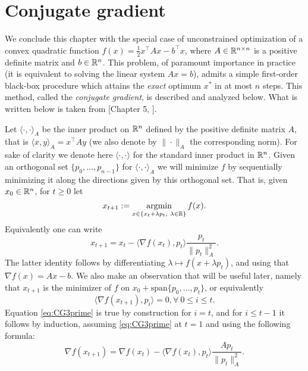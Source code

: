 \section{Conjugate gradient} \label{sec:CG}
We conclude this chapter with the special case of unconstrained optimization of a convex quadratic function $f(x) = \frac12 x^{\top} A x - b^{\top} x$, where $A \in \mathbb{R}^{n \times n}$ is a positive definite matrix and $b \in \mathbb{R}^n$. This problem, of paramount importance in practice (it is equivalent to solving the linear system $Ax = b$), admits a simple first-order black-box procedure which attains the {\em exact} optimum $x^*$ in at most $n$ steps. This method, called the {\em conjugate gradient}, is described and analyzed below. What is written below is taken from [Chapter 5, \cite{NW06}].

Let $\langle \cdot , \cdot\rangle_A$ be the inner product on $\mathbb{R}^n$ defined by the positive definite matrix $A$, that is $\langle x, y\rangle_A = x^{\top} A y$ (we also denote by $\|\cdot\|_A$ the corresponding norm). For sake of clarity we denote here $\langle \cdot , \cdot\rangle$ for the standard inner product in $\mathbb{R}^n$. Given an orthogonal set $\{p_0, \hdots, p_{n-1}\}$ for $\langle \cdot , \cdot \rangle_A$ we will minimize $f$ by sequentially minimizing it along the directions given by this orthogonal set. That is, given $x_0 \in \mathbb{R}^n$, for $t \geq 0$ let
\begin{equation} \label{eq:CG1}
x_{t+1} := \mathop{\mathrm{argmin}}_{x \in \{x_t + \lambda p_t, \ \lambda \in \mathbb{R}\}} f(x) .
\end{equation}
Equivalently one can write
\begin{equation} \label{eq:CG2}
x_{t+1} = x_t - \langle \nabla f(x_t) , p_t \rangle \frac{p_t}{\|p_t\|_A^2} .
\end{equation}
The latter identity follows by differentiating $\lambda \mapsto f(x + \lambda p_t)$, and using that $\nabla f(x) = A x - b$. We also make an observation that will be useful later, namely that $x_{t+1}$ is the minimizer of $f$ on $x_0 + \mathrm{span}\{p_0, \hdots, p_t\}$, or equivalently
\begin{equation} \label{eq:CG3prime}
\langle \nabla f(x_{t+1}), p_i \rangle = 0, \forall \ 0 \leq i \leq t.
\end{equation}
Equation \eqref{eq:CG3prime} is true by construction for $i=t$, and for $i \leq t-1$ it follows by induction, assuming \eqref{eq:CG3prime} at $t=1$ and using the following formula:
\begin{equation} \label{eq:CG3}
\nabla f(x_{t+1}) = \nabla f(x_{t}) - \langle \nabla f(x_{t}) , p_{t} \rangle \frac{A p_{t}}{\|p_t\|_A^2} .
\end{equation}


